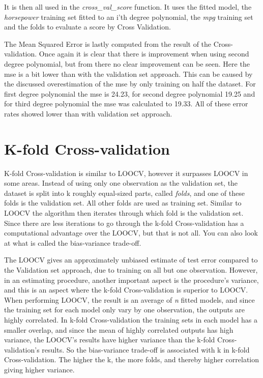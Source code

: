 It is then all used in the \emph{cross\_val\_score} function. It uses the fitted model, the \emph{horsepower} training set fitted to an i'th degree polynomial, the \emph{mpg} training set and the folds to evaluate a score by Cross Validation.



The Mean Squared Error is lastly computed from the result of the Cross-validation. Once again it is clear that there is improvement when using second degree polynomial, but from there no clear improvement can be seen. Here the mse is a bit lower than with the validation set approach. This can be caused by the discussed overestimation of the mse by only training on half the dataset. For first degree polynomial the mse is 24.23, for second degree polynomial 19.25 and for third degree polynomial the mse was calculated to 19.33. All of these error rates showed lower than with validation set approach.


\section{K-fold Cross-validation}
K-fold Cross-validation is similar to LOOCV, however it surpasses LOOCV in some areas. Instead of using only one observation as the validation set, the dataset is split into k roughly equal-sized parts, called \emph{folds}, and one of these folds is the validation set. All other folds are used as training set. Similar to LOOCV the algorithm then iterates through which fold is the validation set. Since there are less iterations to go through the k-fold Cross-validation has a computational advantage over the LOOCV, but that is not all. You can also look at what is called the bias-variance trade-off. 

The LOOCV gives an approximately unbiased estimate of test error compared to the Validation set approach, due to training on all but one observation. However, in an estimating procedure, another important aspect is the procedure's variance, and this is an aspect where the k-fold Cross-validation is superior to LOOCV. When performing LOOCV, the result is an average of \emph{n} fitted models, and since the training set for each model only vary by one observation, the outputs are highly correlated. In k-fold Cross-validation the training sets in each model has a smaller overlap, and since the mean of highly correlated outputs has high variance, the LOOCV's results have higher variance than the k-fold Cross-validation's results. So the bias-variance trade-off is associated with k in k-fold Cross-validation. The higher the k, the more folds, and thereby higher correlation giving higher variance. 

